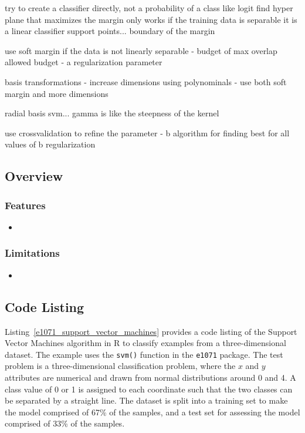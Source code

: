 try to create a classifier directly, not a probability of a class like logit
find hyper plane that maximizes the margin
only works if the training data is separable
it is a linear classifier
support points... boundary of the margin

use soft margin if the data is not linearly separable - budget of max overlap allowed
budget - a regularization parameter

basis transformations - increase dimensions using polynominals
- use both soft margin and more dimensions

radial basis svm...
gamma is like the steepness of the kernel

use crossvalidation to refine the parameter - b
algorithm for finding best for all values of b
regularization



\subsection{Overview}

\subsubsection{Features}

\begin{itemize}
	\item 
\end{itemize}

\subsubsection{Limitations}

\begin{itemize}
	\item 
\end{itemize}


\subsection{Code Listing}
Listing~\ref{e1071_support_vector_machines} provides a code listing of the Support Vector Machines algorithm in R to classify examples from a three-dimensional dataset.
The example uses the \texttt{svm()} function in the \texttt{e1071} package.
The test problem is a three-dimensional classification problem, where the $x$ and $y$ attributes are numerical and drawn from normal distributions around 0 and 4. A class value of 0 or 1 is assigned to each coordinate such that the two classes can be separated by a straight line. The dataset is split into a training set to make the model comprised of 67\% of the samples, and a test set for assessing the model comprised of 33\% of the samples.

